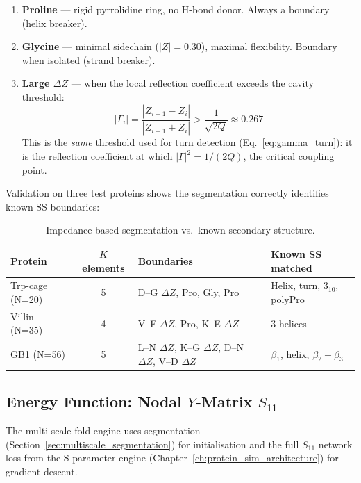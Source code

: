 \begin{enumerate}
\item \textbf{Proline} --- rigid pyrrolidine ring, no H-bond donor.  Always a boundary (helix breaker).
\item \textbf{Glycine} --- minimal sidechain ($|Z| = 0.30$), maximal flexibility.  Boundary when isolated (strand breaker).
\item \textbf{Large $\Delta Z$} --- when the local reflection coefficient exceeds the cavity threshold:
\begin{equation}
|\Gamma_i| = \frac{|Z_{i+1} - Z_i|}{|Z_{i+1} + Z_i|} > \frac{1}{\sqrt{2Q}} \approx 0.267
\label{eq:boundary_threshold}
\end{equation}
This is the \emph{same} threshold used for turn detection (Eq.~\ref{eq:gamma_turn}): it is the reflection coefficient at which $|\Gamma|^2 = 1/(2Q)$, the critical coupling point.
\end{enumerate}

Validation on three test proteins shows the segmentation correctly identifies known SS boundaries:

\begin{table}[H]
\centering
\caption{Impedance-based segmentation vs.\ known secondary structure.}
\label{tab:segmentation_validation}
\small
\begin{tabular}{@{}l c l l@{}}
\toprule
\textbf{Protein} & \textbf{$K$ elements} & \textbf{Boundaries} & \textbf{Known SS matched} \\
\midrule
Trp-cage (N=20) & 5 & D--G $\Delta Z$, Pro, Gly, Pro & Helix, turn, 3$_{10}$, polyPro \\
Villin (N=35) & 4 & V--F $\Delta Z$, Pro, K--E $\Delta Z$ & 3 helices \\
GB1 (N=56) & 5 & L--N $\Delta Z$, K--G $\Delta Z$, D--N $\Delta Z$, V--D $\Delta Z$ & $\beta_1$, helix, $\beta_2 + \beta_3$ \\
\bottomrule
\end{tabular}
\end{table}

\subsection{Energy Function: Nodal $Y$-Matrix $S_{11}$}
\label{sec:s11_cascade}
\label{sec:multiscale_energy}

The multi-scale fold engine uses segmentation (Section~\ref{sec:multiscale_segmentation}) for initialisation and the full $S_{11}$ network loss from the S-parameter engine (Chapter~\ref{ch:protein_sim_architecture}) for gradient descent.

